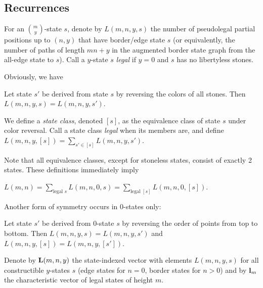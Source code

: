 \documentclass{article}
\begin{document}
\subsection{Recurrences}

\begin{defin}
For an $\binom{m}{y}$-state $s$,
denote by $L(m,n,y,s)$ the number of pseudolegal
partial positions up to $(n,y)$ that have border/edge state $s$
(or equivalently, the number of paths of length $mn+y$ in the augmented
border state graph from the all-edge state to $s$).
Call a $y$-state $s$ {\em legal} if $y=0$ and $s$ has no libertyless stones.
\end{defin}

Obviously, we have

\begin{lemma}
\label{color-symmetry}
Let state $s'$ be derived from state $s$ by reversing the colors
of all stones. Then $L(m,n,y,s) = L(m,n,y,s')$.
\end{lemma}

\begin{defin}
We define a {\em state class}, denoted $[s]$, as the equivalence class
of state $s$ under color reversal.
Call a state class {\em legal} when its members are,
and define $L(m,n,y,[s]) = \sum_{s' \in [s]} L(m,n,y,s')$.
\end{defin}

Note that all equivalence classes, except for stoneless states,
consist of exactly 2 states.
These definitions immediately imply

\begin{lemma}
$L(m,n) = \sum_{\mbox{legal }s} L(m,n,0,s)
        = \sum_{\mbox{legal }[s]} L(m,n,0,[s])$.
\label{legal-states}
\end{lemma}

Another form of symmetry occurs in $0$-states only:

\begin{lemma}
\label{up-down-symmetry}
Let state $s'$ be derived from $0$-state $s$ by
reversing the order of points from top to bottom.
Then $L(m,n,y,s) = L(m,n,y,s')$ and $L(m,n,y,[s]) = L(m,n,y,[s'])$.
\end{lemma}

\begin{defin}
Denote by $\mathbf{L}(m,n,y)$ the state-indexed vector with elements
$L(m,n,y,s)$ for all constructible $y$-states $s$ (edge states for $n=0$,
border states for $n>0$) and by $\mathbf{l}_m$ the
characteristic vector of legal states of height $m$.
\end{defin}
\end{document}
